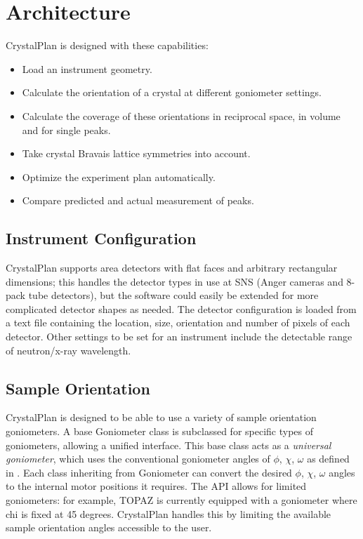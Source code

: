 \documentclass[final]{iucr}              %
\begin{document}
\section{Architecture}

CrystalPlan is designed with these capabilities:

\begin{itemize}
  \item Load an instrument geometry.
  \item Calculate the orientation of a crystal at different goniometer settings.
  \item Calculate the coverage of these orientations in reciprocal space,
  in volume and for single peaks.
  \item Take crystal Bravais lattice symmetries into account.
  \item Optimize the experiment plan automatically.
  \item Compare predicted and actual measurement of peaks.
\end{itemize}

\subsection{Instrument Configuration}

CrystalPlan supports area detectors with flat faces and arbitrary rectangular
dimensions; this handles the detector types in use at SNS (Anger cameras and
8-pack tube detectors), but the software could easily be extended for more
complicated detector shapes as needed. The detector configuration is loaded from
a text file containing the location, size, orientation and number of pixels of
each detector. Other settings to be set for an instrument include the
detectable range of neutron/x-ray wavelength.


\subsection{Sample Orientation}

CrystalPlan is designed to be able to use a variety of sample orientation
goniometers. A base Goniometer class is subclassed for specific types of
goniometers, allowing a unified interface. This base class acts as a
\emph{universal goniometer},
which uses the conventional goniometer angles of
$\phi$, $\chi$, $\omega$ as defined in \cite{busing67}.
Each class inheriting from Goniometer can convert
the desired $\phi$, $\chi$, $\omega$ angles to the internal motor positions it requires. The API allows
for limited goniometers: for example, TOPAZ is currently equipped with a
goniometer where chi is fixed at 45 degrees. CrystalPlan handles this by
limiting the available sample orientation angles accessible to the user.        
   
\end{document}
